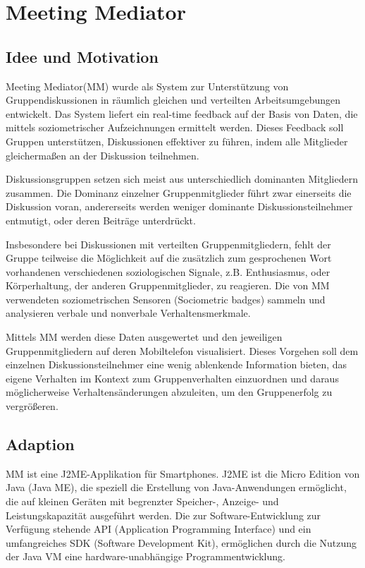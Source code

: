 \section{Meeting Mediator}

\subsection{Idee und Motivation}
Meeting Mediator(MM) \cite{KimChaHolPent2008} wurde als System zur
Un\-ter\-stütz\-ung von Gruppendiskussionen in räumlich gleichen und verteilten
Arbeitsumgebungen entwickelt. Das System liefert ein real-time feedback auf der
Basis von Daten, die mittels soziometrischer Aufzeichnungen ermittelt werden.
Dieses Feedback soll Gruppen unterstützen, Diskussionen effektiver zu führen,
indem alle Mitglieder gleichermaßen an der Diskussion teilnehmen.

Diskussionsgruppen setzen sich meist aus unterschiedlich dominanten Mitgliedern
zusammen. Die Dominanz einzelner Gruppenmitglieder führt zwar einerseits die
Diskussion voran, andererseits werden weniger dominante Diskussionsteilnehmer 
entmutigt, oder deren Beiträge un\-ter\-drückt.

Insbesondere bei Diskussionen mit verteilten Gruppenmitgliedern, fehlt der
Gruppe teilweise die Möglichkeit auf die zusätzlich zum gesprochenen Wort
vorhandenen verschiedenen soziologischen Signale, z.B. Enthusiasmus, oder
Körperhaltung, der anderen Gruppenmitglieder, zu reagieren.
Die von MM verwendeten soziometrischen Sensoren (Sociometric badges)
\cite{MITbadge} sammeln und analysieren verbale und nonverbale
Verhaltensmerkmale.

Mittels MM werden diese Daten ausgewertet und den jeweiligen Gruppenmitgliedern
auf deren Mobiltelefon visualisiert. Dieses Vorgehen soll dem einzelnen
Diskussionsteilnehmer eine wenig ablenkende Information bieten, das eigene
Verhalten im Kontext zum Gruppenverhalten einzuordnen und daraus möglicherweise
Ver\-hal\-tens\-än\-de\-run\-gen abzuleiten, um den Gruppenerfolg zu
vergrößeren.

\subsection{Adaption}

MM ist eine J2ME-Applikation für Smartphones. J2ME \cite{J2ME} ist die Micro
Edition von Java (Java ME), die speziell die Erstellung von Java-Anwendungen
ermöglicht, die auf kleinen Geräten mit begrenzter Speicher-, Anzeige- und
Leistungskapazität ausgeführt werden. Die zur Software-Ent\-wick\-lung zur
Verfügung stehende API (Application Programming Interface) und ein umfangreiches
SDK (Software Development Kit), ermöglichen durch die Nutzung der Java VM eine
hardware-un\-ab\-hän\-gi\-ge Programmentwicklung.

